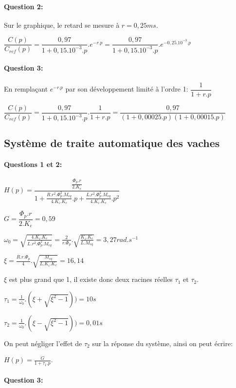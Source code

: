 \paragraph{Question 2:} Sur le graphique, le retard se mesure à $r=0,25ms$.

$\dfrac{C(p)}{C_{ref}(p)}=\dfrac{0,97}{1+0,15.10^{-3}.p}.e^{-r.p}=\dfrac{0,97}{1+0,15.10^{-3}.p}.e^{-0,25.10^{-3}.p}$

\paragraph{Question 3:} En remplaçant $e^{-r.p}$ par son développement limité à l'ordre 1: $\dfrac{1}{1+r.p}$

$\dfrac{C(p)}{C_{ref}(p)}=\dfrac{0,97}{1+0,15.10^{-3}.p}.\dfrac{1}{1+r.p}=\dfrac{0,97}{(1+0,00025.p)(1+0,00015.p)}$

\subsection{Système de traite automatique des vaches}

\paragraph{Questions 1 et 2:} 

$H(p)=\dfrac{\frac{\Phi_p.r}{2.K_e}}{1+\frac{R.r^2.\Phi_p^2.M_{eq}}{4.K_i.K_e}.p+\frac{L.r^2.\Phi_p^2.M_{eq}}{4.K_i.K_e}.p^2}$

$G=\dfrac{\Phi_p.r}{2.K_e}=0,59$

$\omega_0=\sqrt{\frac{4.K_i.K_e}{L.r^2.\Phi_p^2.M_{eq}}}=\frac{2}{r.\Phi_p}.\sqrt{\frac{K_i.K_e}{L.M_{eq}}}=3,27rad.s^{-1}$

$\xi=\frac{R.r.\Phi_p}{4}.\sqrt{\frac{M_{eq}}{L.K_i.K_e}}=16,14$

$\xi$ est plus grand que 1, il existe donc deux racines réelles $\tau_1$ et $\tau_2$.

$\tau_1=\frac{1}{\omega_0}.(\xi+\sqrt{\xi^2-1}))=10s$

$\tau_2=\frac{1}{\omega_0}.(\xi-\sqrt{\xi^2-1}))=0,01s$

On peut négliger l'effet de $\tau_2$ sur la réponse du système, ainsi on peut écrire:

$H(p)=\frac{G}{1+\tau_1.p}$.

\paragraph{Question 3:}

